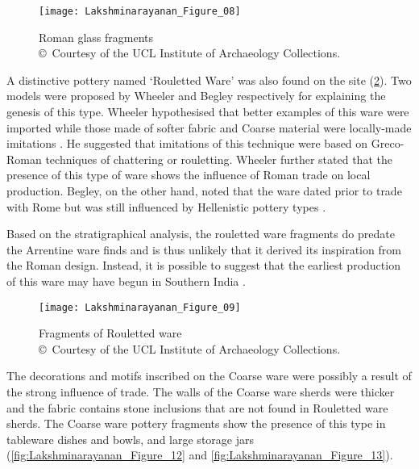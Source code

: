 \begin{figure}[!htb]
	\texttt{[image: Lakshminarayanan\_Figure\_08]}
	\caption{Roman glass fragments\\
		{\normalfont\scriptsize\copyright\ Courtesy of the UCL Institute of Archaeology Collections.
	}}
	\label{fig:Lakshminarayanan_Figure_08}
\end{figure}

A distinctive pottery named ‘Rouletted Ware’ was also found on the site (\cref{fig:Lakshminarayanan_Figure_09}). Two models were proposed by Wheeler and Begley respectively for explaining the genesis of this type. Wheeler hypothesised that better examples of this ware were imported while those made of softer fabric and Coarse material were locally-made imitations \parencite[][149]{wheeler1954}. He suggested that imitations of this technique were based on Greco-Roman techniques of chattering or rouletting. Wheeler further stated that the presence of this type of ware shows the influence of Roman trade on local production. Begley, on the other hand, noted that the ware dated prior to trade with Rome but was still influenced by Hellenistic pottery types \parencite[][427]{begley1988}.

Based on the stratigraphical analysis, the rouletted ware fragments do predate the Arrentine ware finds and is thus unlikely that it derived its inspiration from the Roman design. Instead, it is possible to suggest that the earliest production of this ware may have begun in Southern India \parencite[][54]{begley1986}.

\begin{figure}[!htb]
	\texttt{[image: Lakshminarayanan\_Figure\_09]}
	\caption{Fragments of Rouletted ware\\
		{\normalfont\scriptsize\copyright\ Courtesy of the UCL Institute of Archaeology Collections.
	}}
	\label{fig:Lakshminarayanan_Figure_09}
\end{figure}

The decorations and motifs inscribed on the Coarse ware were possibly a result of the strong influence of trade. The walls of the Coarse ware sherds were thicker and the fabric contains stone inclusions that are not found in Rouletted ware sherds. The Coarse ware pottery fragments show the presence of this type in tableware dishes and bowls, and large storage jars (\cref{fig:Lakshminarayanan_Figure_12} and \cref{fig:Lakshminarayanan_Figure_13}).

